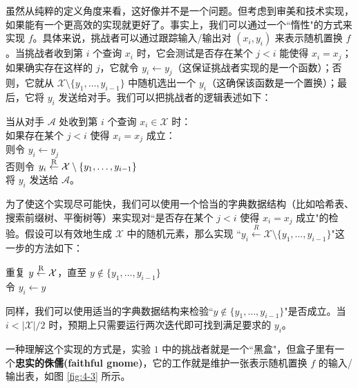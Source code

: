 虽然从纯粹的定义角度来看，这好像并不是一个问题。但考虑到审美和技术实现，如果能有一个更高效的实现就更好了。事实上，我们可以通过一个``惰性"的方式来实现 $f$。具体来说，挑战者可以通过跟踪输入/输出对 $(x_i,y_i)$ 来表示随机置换 $f$。当挑战者收到第 $i$ 个查询 $x_i$ 时，它会测试是否存在某个 $j<i$ 能使得 $x_i=x_j$；如果确实存在这样的 $j$，它就令 $y_i\leftarrow y_j$（这保证挑战者实现的是一个函数）；否则，它就从 $\mathcal{X}\setminus\{y_1,\dots,y_{i-1}\}$ 中随机选出一个 $y_i$（这确保该函数是一个置换）；最后，它将 $y_i$ 发送给对手。我们可以把挑战者的逻辑表述如下：

\vspace*{10pt}

\hspace*{5pt} 当从对手 $\mathcal{A}$ 处收到第 $i$ 个查询 $x_i\in\mathcal{X}$ 时：\\
\hspace*{50pt} 如果存在某个 $j<i$ 使得 $x_i=x_j$ 成立：\\
\hspace*{75pt} 则令 $y_i\leftarrow y_j$\\
\hspace*{75pt} 否则令 $y_i\overset{\rm R}\leftarrow\mathcal{X}\setminus\{y_1,\dots,y_{i-1}\}$\\
\hspace*{50pt} 将 $y_i$ 发送给 $\mathcal{A}$。

\vspace*{10pt}

\noindent
为了使这个实现尽可能快，我们可以使用一个恰当的字典数据结构（比如哈希表、搜索前缀树、平衡树等）来实现对``是否存在某个 $j<i$ 使得 $x_i=x_j$ 成立"的检验。假设可以有效地生成 $\mathcal{X}$ 中的随机元素，那么实现 ``$y_i\overset{R}\leftarrow\mathcal{X}\setminus\{y_1,\dots,y_{i-1}\}$"这一步的方法如下：

\vspace*{10pt}

\hspace*{5pt} 重复 $y\overset{\rm R}\leftarrow\mathcal{X}$，直至 $y\notin\{y_1,\dots,y_{i-1}\}$\\
\hspace*{26pt} 令 $y_i\leftarrow y$

\vspace*{10pt}

\noindent
同样，我们可以使用适当的字典数据结构来检验``$y\notin\{y_1,\dots,y_{i-1}\}$"是否成立。当 $i<{|\mathcal{X}|}/{2}$ 时，预期上只需要运行两次迭代即可找到满足要求的 $y_i$。

一种理解这个实现的方式是，实验 $1$ 中的挑战者就是一个``黑盒"，但盒子里有一个\textbf{忠实的侏儒(faithful gnome)}，它的工作就是维护一张表示随机置换 $f$ 的输入/输出表，如图 \ref{fig:4-3} 所示。

